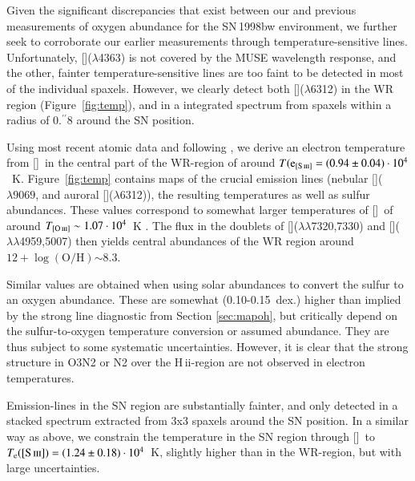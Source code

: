 \documentclass[traditabstract]{aa}
\newcommand{\farc}{\hbox{$.\!\!^{\prime\prime}$}}
\newcommand{\hii}{\mbox{H\,{\sc ii}}}
\newcommand{\oh}{$12+\log(\mathrm{O/H})$}
\newcommand{\siii}{[\ion{S}{iii}]}
\newcommand{\oii}{[\ion{O}{ii}]}
\newcommand{\oiii}{[\ion{O}{iii}]}
\begin{document}
Given the significant discrepancies that exist between our and previous measurements of oxygen abundance for the SN\,1998bw environment, we further seek to corroborate our earlier measurements through temperature-sensitive lines. Unfortunately, \oiii($\lambda$4363) is not covered by the MUSE wavelength response, and the other, fainter temperature-sensitive lines are too faint to be detected in most of the individual spaxels. However, we clearly detect both \siii($\lambda$6312) in the WR region (Figure~\ref{fig:temp}), and in a integrated spectrum from spaxels within a radius of 0\farc{8} around the SN position. 


Using most recent atomic data and following \citet{2013ApJS..207...21N}, we derive an electron temperature from \siii\, in the central part of the WR-region of around $T(\mathrm{e}_{\siii}=(0.94\pm0.04)\cdot10^{4}$~K. Figure~\ref{fig:temp} contains maps of the crucial emission lines (nebular \siii($\lambda9069$, and auroral \siii($\lambda$6312)), the resulting temperatures as well as sulfur abundances. These values correspond to somewhat larger temperatures of \oiii~of around $T_{\oiii} \sim 1.07\cdot10^{4}$~K \citep{2006A&A...448..955I, 2012A&A...547A..29B}. The flux in the doublets of \oii($\lambda\lambda$7320,7330) and \oiii($\lambda\lambda$4959,5007) then yields central abundances of the WR region around \oh $\sim 8.3$. 

Similar values are obtained when using solar abundances to convert the sulfur to an oxygen abundance. These are somewhat (0.10-0.15~dex.) higher than implied by the strong line diagnostic from Section \ref{sec:mapoh}, but critically depend on the sulfur-to-oxygen temperature conversion or assumed abundance. They are thus subject to some systematic uncertainties. However, it is clear that the strong structure in O3N2 or N2 over the \hii-region are not observed in electron temperatures.

Emission-lines in the SN region are substantially fainter, and only detected in a stacked spectrum extracted from 3x3 spaxels around the SN position. In a similar way as above, we constrain the temperature in the SN region through \siii\, to $T_{\mathrm{e}}(\siii)=(1.24\pm0.18)\cdot10^{4}$~K, slightly higher than in the WR-region, but with large uncertainties. 
\end{document}
